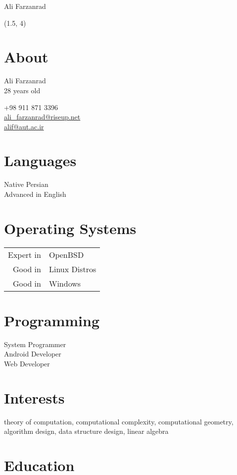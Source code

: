 \documentclass[a4paper,10pt]{article}
\begin{document}
{\Huge Ali Farzanrad}

\begin{textblock}{3.8}(1.5, 4)
	\raggedleft
	\section*{About}

	Ali Farzanrad \\
	28 years old

	+98 911 871 3396 \\
	\href{mailto:ali_farzanrad@riseup.net}{ali\_farzanrad@riseup.net} \\
	\href{mailto:alif@aut.ac.ir}{alif@aut.ac.ir}

	\section*{Languages}

	Native Persian \\
	Advanced in English

	\section*{Operating Systems}

	\begin{tabular}{rl}
		Expert in & OpenBSD \\
		Good in & Linux Distros \\
		Good in & Windows
	\end{tabular}

	\section*{Programming}

	System Programmer \\
	Android Developer \\
	Web Developer

\end{textblock}

\section*{{\color{blue}Interests}}

theory of computation, computational complexity, computational
geometry, algorithm design, data structure design, linear algebra

\section*{{\color{red}Education}}
\end{document}
